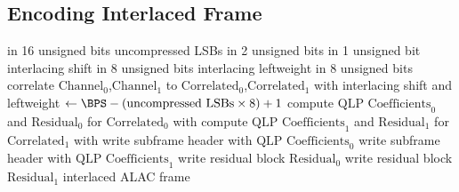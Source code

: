 \clearpage

\subsection{Encoding Interlaced Frame}
{
 in 16 unsigned bits
\WRITE uncompressed LSBs in 2 unsigned bits\;
 in 1 unsigned bit
\WRITE interlacing shift in 8 unsigned bits\;
\WRITE interlacing leftweight in 8 unsigned bits\;
correlate $\text{Channel}_0$,$\text{Channel}_1$ to $\text{Correlated}_0$,$\text{Correlated}_1$ with interlacing shift and leftweight\;
\SAMPLESIZE $\leftarrow \text{\BPS} - (\text{uncompressed LSBs} \times 8) + 1$\;
compute $\text{QLP Coefficients}_0$ and $\text{Residual}_0$ for $\text{Correlated}_0$ with \SAMPLESIZE\;
compute $\text{QLP Coefficients}_1$ and $\text{Residual}_1$ for $\text{Correlated}_1$ with \SAMPLESIZE\;
write subframe header with $\text{QLP Coefficients}_0$\;
write subframe header with $\text{QLP Coefficients}_1$\;
write residual block $\text{Residual}_0$\;
write residual block $\text{Residual}_1$\;
\Return interlaced ALAC frame\;
\EALGORITHM
}

